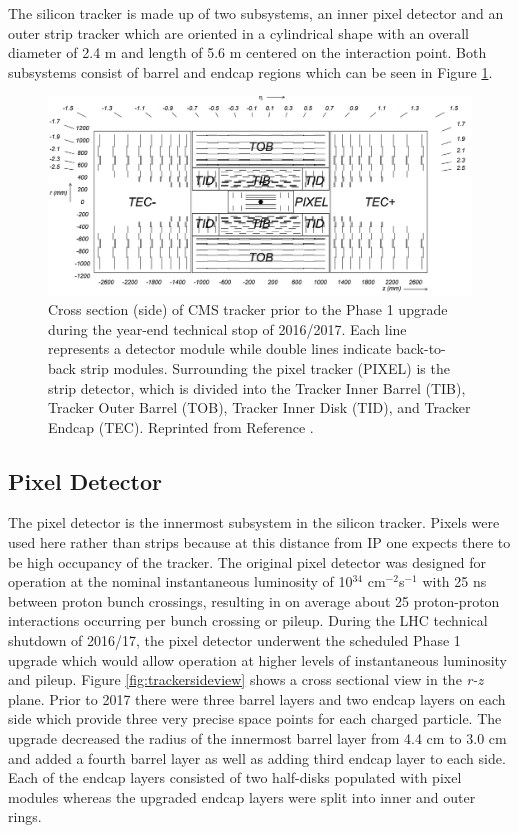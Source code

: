 The silicon tracker is made up of two subsystems, an inner pixel detector and an outer strip tracker which are oriented in a cylindrical shape with an overall diameter of 2.4 m and length of 5.6 m centered on the interaction point.  Both subsystems consist of barrel and endcap regions which can be seen in Figure \ref{fig:trackerlayoutv2}.  

\begin{figure}[h]
	\centering
	\includegraphics[width=0.7\linewidth]{Figures/TrackerLayout_v2}
	\caption{Cross section (side) of CMS tracker prior to the Phase 1 upgrade during the year-end technical stop of 2016/2017. Each line represents a detector module while double lines indicate back-to-back strip modules. Surrounding the pixel tracker (PIXEL) is the strip detector, which is divided into the Tracker Inner Barrel (TIB), Tracker Outer Barrel (TOB), Tracker Inner Disk (TID), and Tracker Endcap (TEC). Reprinted from Reference \cite{Chatrchyan:1704291}.}
	\label{fig:trackerlayoutv2}
\end{figure}

\subsection{Pixel Detector}
The pixel detector is the innermost subsystem in the silicon tracker.  Pixels were used here rather than strips because at this distance from IP one expects there to be high occupancy of the tracker.  The original pixel detector was designed for operation at the nominal instantaneous luminosity of 10$^{34}$ cm$^{-2}$s$^{-1}$ with 25 ns between proton bunch crossings, resulting in on average about 25 proton-proton interactions occurring per bunch crossing or pileup.  During the LHC technical shutdown of 2016/17, the pixel detector underwent the scheduled Phase 1 upgrade which would allow operation at higher levels of instantaneous luminosity and pileup.  Figure \ref{fig:trackersideview} shows a cross sectional view in the \textit{r-z} plane.  Prior to 2017 there were three barrel layers and two endcap layers on each side which provide three very precise space points for each charged particle.  The upgrade decreased the radius of the innermost barrel layer from 4.4 cm to 3.0 cm and added a fourth barrel layer as well as adding third endcap layer to each side.  Each of the endcap layers consisted of two half-disks populated with pixel modules whereas the upgraded endcap layers were split into inner and outer rings. \cite{Dominguez:1481838}

